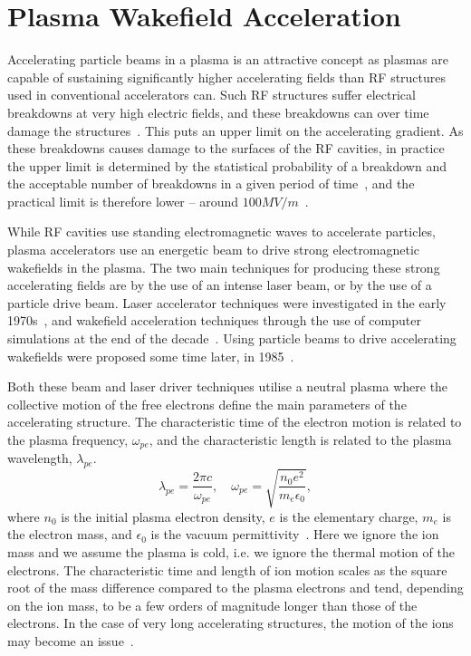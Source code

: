 \section{Plasma Wakefield Acceleration}
\label{Int:PWFA}

Accelerating particle beams in a plasma is an attractive concept as plasmas are capable of sustaining significantly higher accelerating fields than RF structures used in conventional accelerators can. Such RF structures suffer electrical breakdowns at very high electric fields, and these breakdowns can over time damage the structures~\cite{braun:2003}. This puts an upper limit on the accelerating gradient. As these breakdowns causes damage to the surfaces of the RF cavities, in practice the upper limit is determined by the statistical probability of a breakdown and the acceptable number of breakdowns in a given period of time~\cite{pritzkau:2002}, and the practical limit is therefore lower -- around $100\unit{MV/m}$~\cite{aicheler:2012}.

While RF cavities use standing electromagnetic waves to accelerate particles, plasma accelerators use an energetic beam to drive strong electromagnetic wakefields in the plasma. The two main techniques for producing these strong accelerating fields are by the use of an intense laser beam, or by the use of a particle drive beam. Laser accelerator techniques were investigated in the early 1970s~\cite{chan:1971, palmer:1972}, and wakefield acceleration techniques through the use of computer simulations at the end of the decade~\cite{tajima:1979}. Using particle beams to drive accelerating wakefields were proposed some time later, in 1985~\cite{chen:1985}.

Both these beam and laser driver techniques utilise a neutral plasma where the collective motion of the free electrons define the main parameters of the accelerating structure. The characteristic time of the electron motion is related to the plasma frequency, $\omega_{pe}$, and the characteristic length is related to the plasma wavelength, $\lambda_{pe}$.
\begin{equation}
    \lambda_{pe} = \frac{2\pi c}{\omega_{pe}}, \quad
    \omega_{pe}  = \sqrt{\frac{n_{0}e^{2}}{m_{e}\epsilon_{0}}}, \label{EQ:PWFA:L0W0}
\end{equation}
where $n_{0}$ is the initial plasma electron density, $e$ is the elementary charge, $m_{e}$ is the electron mass, and $\epsilon_{0}$ is the vacuum permittivity~\cite{tonks:1929, esarey:1996, pecseli:2012}. Here we ignore the ion mass and we assume the plasma is cold, i.e. we ignore the thermal motion of the electrons. The characteristic time and length of ion motion scales as the square root of the mass difference compared to the plasma electrons and tend, depending on the ion mass, to be a few orders of magnitude longer than those of the electrons. In the case of very long accelerating structures, the motion of the ions may become an issue~\cite{rosenzweig:2005}.

